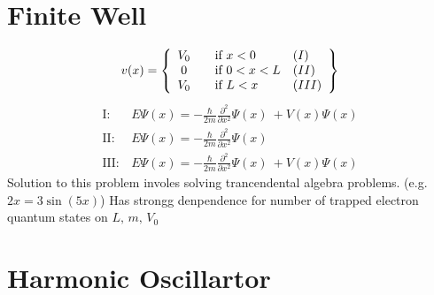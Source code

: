 \documentclass[11pt]{article}
\begin{document}
\section{Finite Well}
\label{sec:org93a7845}
\begin{align*}
v(x) = \left\{ 
  \begin{array}{ c l l }
    V_0 & \quad \text{if } x < 0 & (I) \\
    0   & \quad \text{if } 0 < x < L & (II) \\
    V_0 & \quad \text{if } L < x & (III) \\
  \end{array}
\right \}
\end{align*}
\begin{align*}
\mathrm{I:}  &E \Psi (x) = - \frac{\hbar}{2m} \frac{\partial^2}{\partial x^2} \Psi (x)\ + V(x) \Psi (x) \\
\mathrm{II:}  &E \Psi (x) = - \frac{\hbar}{2m} \frac{\partial^2}{\partial x^2} \Psi (x)\ \\
\mathrm{III:}  &E \Psi (x) = - \frac{\hbar}{2m} \frac{\partial^2}{\partial x^2} \Psi (x)\ + V(x) \Psi (x)
\end{align*}
Solution to this problem involes solving trancendental algebra problems. (e.g. \(2x = 3 \sin(5x)\))
Has strongg denpendence for number of trapped electron quantum states on \(L\text{, } m\text{, } V_0\) 
\section{Harmonic Oscillartor}
\label{sec:orga64811c}
\end{document}

